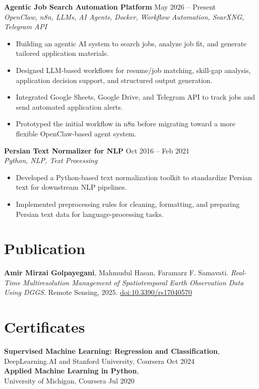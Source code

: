 \documentclass[a4paper,10pt]{article}
\begin{document}
\noindent
\textbf{Agentic Job Search Automation Platform} \hfill May 2026 -- Present \\
\textit{OpenClaw, n8n, LLMs, AI Agents, Docker, Workflow Automation, SearXNG, Telegram API}
\begin{itemize}[leftmargin=0.25in]
    \item Building an agentic AI system to search jobs, analyze job fit, and generate tailored application materials.
    \item Designed LLM-based workflows for resume/job matching, skill-gap analysis, application decision support, and structured output generation.
    \item Integrated Google Sheets, Google Drive, and Telegram API to track jobs and send automated application alerts.
    \item Prototyped the initial workflow in n8n before migrating toward a more flexible OpenClaw-based agent system.
\end{itemize}

\noindent
\textbf{Persian Text Normalizer for NLP} \hfill Oct 2016 -- Feb 2021 \\
\textit{Python, NLP, Text Processing}
\begin{itemize}[leftmargin=0.25in]
    \item Developed a Python-based text normalization toolkit to standardize Persian text for downstream NLP pipelines.
    \item Implemented preprocessing rules for cleaning, formatting, and preparing Persian text data for language-processing tasks.
\end{itemize}

\section*{Publication}

\textbf{Amir Mirzai Golpayegani}, Mahmudul Hasan, Faramarz F. Samavati.
\textit{Real-Time Multiresolution Management of Spatiotemporal Earth Observation Data Using DGGS}.
Remote Sensing, 2025. \href{https://doi.org/10.3390/rs17040570}{doi:10.3390/rs17040570}


\section*{Certificates}

\textbf{Supervised Machine Learning: Regression and Classification},\\
DeepLearning.AI and Stanford University, Coursera
\hfill Oct 2024 \\
\textbf{Applied Machine Learning in Python},\\
University of Michigan, Coursera
\hfill Jul 2020
\end{document}

